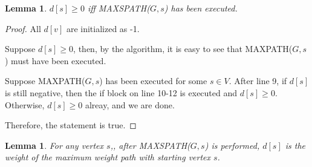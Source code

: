 \documentclass[10pt]{article}
\newtheorem{lemma}[theorem]{Lemma}
\begin{document}
\begin{lemma}
	$d[s] \geq 0$ iff MAXSPATH($G, s$) has been executed.
\end{lemma}
\begin{proof}
	All $d[v]$ are initialized as -1.

	Suppose $d[s] \geq 0$, then, by the algorithm, it is easy to see that
	MAXPATH($G,s$) must have been executed.

	Suppose MAXPATH($G,s$) has been executed for some $s \in V$.
	After line 9, if $d[s]$ is still negative, then the if block on line 10-12
	is executed and $d[s] \geq 0$.
	Otherwise, $d[s] \geq 0$ alreay, and we are done.

	Therefore, the statement is true.
\end{proof}

\begin{lemma}
	For any vertex $s$,, after MAXSPATH($G, s$) is performed, $d[s]$ is the
	weight of the maximum weight path with starting vertex $s$.
\end{lemma}
\end{document}
